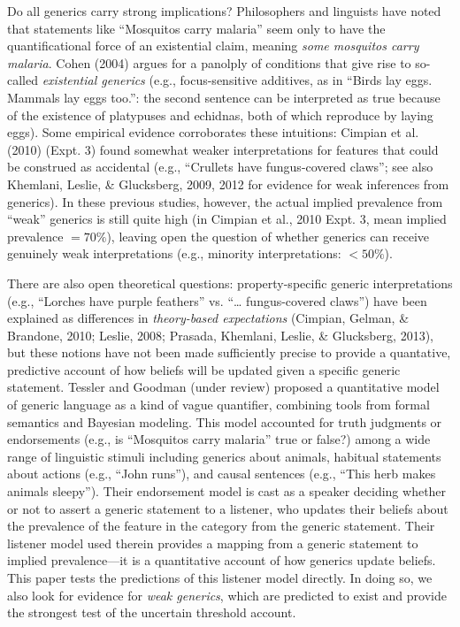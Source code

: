 \documentclass[,man,floatsintext]{apa6}
\theoremstyle{definition}
\theoremstyle{definition}
\theoremstyle{definition}
\theoremstyle{remark}
\begin{document}
Do all generics carry strong implications? Philosophers and linguists
have noted that statements like \enquote{Mosquitos carry malaria} seem
only to have the quantificational force of an existential claim, meaning
\emph{some mosquitos carry malaria}. Cohen (2004) argues for a panolply
of conditions that give rise to so-called \emph{existential generics}
(e.g., focus-sensitive additives, as in \enquote{Birds lay eggs. Mammals
lay eggs too.}: the second sentence can be interpreted as true because
of the existence of platypuses and echidnas, both of which reproduce by
laying eggs). Some empirical evidence corroborates these intuitions:
Cimpian et al. (2010) (Expt. 3) found somewhat weaker interpretations
for features that could be construed as accidental (e.g., ``Crullets
have fungus-covered claws''; see also Khemlani, Leslie, \& Glucksberg,
2009, 2012 for evidence for weak inferences from generics). In these
previous studies, however, the actual implied prevalence from
\enquote{weak} generics is still quite high (in Cimpian et al., 2010
Expt. 3, mean implied prevalence \(= 70\%\)), leaving open the question
of whether generics can receive genuinely weak interpretations (e.g.,
minority interpretations: \(< 50\%\)).

There are also open theoretical questions: property-specific generic
interpretations (e.g., \enquote{Lorches have purple feathers} vs.
\enquote{\ldots{} fungus-covered claws}) have been explained as
differences in \emph{theory-based expectations} (Cimpian, Gelman, \&
Brandone, 2010; Leslie, 2008; Prasada, Khemlani, Leslie, \& Glucksberg,
2013), but these notions have not been made sufficiently precise to
provide a quantative, predictive account of how beliefs will be updated
given a specific generic statement. Tessler and Goodman (under review)
proposed a quantitative model of generic language as a kind of vague
quantifier, combining tools from formal semantics and Bayesian modeling.
This model accounted for truth judgments or endorsements (e.g., is
\enquote{Mosquitos carry malaria} true or false?) among a wide range of
linguistic stimuli including generics about animals, habitual statements
about actions (e.g., \enquote{John runs}), and causal sentences (e.g.,
\enquote{This herb makes animals sleepy}). Their endorsement model is
cast as a speaker deciding whether or not to assert a generic statement
to a listener, who updates their beliefs about the prevalence of the
feature in the category from the generic statement. Their listener model
used therein provides a mapping from a generic statement to implied
prevalence---it is a quantitative account of how generics update
beliefs. This paper tests the predictions of this listener model
directly. In doing so, we also look for evidence for \emph{weak
generics}, which are predicted to exist and provide the strongest test
of the uncertain threshold account.
\end{document}

